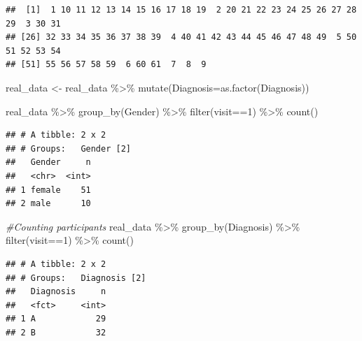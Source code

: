 \documentclass[
]{article}
\newenvironment{Shaded}{\begin{snugshade}}{\end{snugshade}}
\newcommand{\AttributeTok}[1]{\textcolor[rgb]{0.77,0.63,0.00}{#1}}
\newcommand{\CommentTok}[1]{\textcolor[rgb]{0.56,0.35,0.01}{\textit{#1}}}
\newcommand{\DecValTok}[1]{\textcolor[rgb]{0.00,0.00,0.81}{#1}}
\newcommand{\FunctionTok}[1]{\textcolor[rgb]{0.00,0.00,0.00}{#1}}
\newcommand{\NormalTok}[1]{#1}
\newcommand{\OtherTok}[1]{\textcolor[rgb]{0.56,0.35,0.01}{#1}}
\newcommand{\SpecialCharTok}[1]{\textcolor[rgb]{0.00,0.00,0.00}{#1}}
\begin{document}
\begin{Shaded}
\end{Shaded}

\begin{verbatim}
##  [1]  1 10 11 12 13 14 15 16 17 18 19  2 20 21 22 23 24 25 26 27 28 29  3 30 31
## [26] 32 33 34 35 36 37 38 39  4 40 41 42 43 44 45 46 47 48 49  5 50 51 52 53 54
## [51] 55 56 57 58 59  6 60 61  7  8  9
\end{verbatim}

\begin{Shaded}
\begin{Highlighting}[]
\NormalTok{real\_data }\OtherTok{\textless{}{-}}\NormalTok{ real\_data }\SpecialCharTok{\%\textgreater{}\%} 
  \FunctionTok{mutate}\NormalTok{(}\AttributeTok{Diagnosis=}\FunctionTok{as.factor}\NormalTok{(Diagnosis))}

\NormalTok{real\_data }\SpecialCharTok{\%\textgreater{}\%} 
  \FunctionTok{group\_by}\NormalTok{(Gender) }\SpecialCharTok{\%\textgreater{}\%} 
  \FunctionTok{filter}\NormalTok{(visit}\SpecialCharTok{==}\DecValTok{1}\NormalTok{) }\SpecialCharTok{\%\textgreater{}\%} 
  \FunctionTok{count}\NormalTok{()}
\end{Highlighting}
\end{Shaded}

\begin{verbatim}
## # A tibble: 2 x 2
## # Groups:   Gender [2]
##   Gender     n
##   <chr>  <int>
## 1 female    51
## 2 male      10
\end{verbatim}

\begin{Shaded}
\begin{Highlighting}[]
\CommentTok{\#Counting participants}
\NormalTok{real\_data }\SpecialCharTok{\%\textgreater{}\%}
  \FunctionTok{group\_by}\NormalTok{(Diagnosis) }\SpecialCharTok{\%\textgreater{}\%}
  \FunctionTok{filter}\NormalTok{(visit}\SpecialCharTok{==}\DecValTok{1}\NormalTok{) }\SpecialCharTok{\%\textgreater{}\%} 
  \FunctionTok{count}\NormalTok{()}
\end{Highlighting}
\end{Shaded}

\begin{verbatim}
## # A tibble: 2 x 2
## # Groups:   Diagnosis [2]
##   Diagnosis     n
##   <fct>     <int>
## 1 A            29
## 2 B            32
\end{verbatim}
\end{document}
